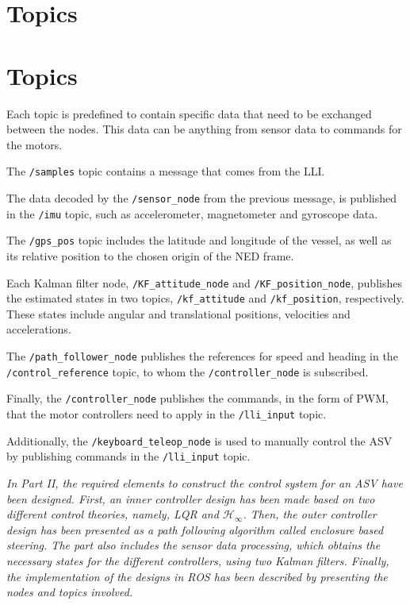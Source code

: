 \section{Topics}
\section{Topics}
Each topic is predefined to contain specific data that need to be exchanged between the nodes. This data can be anything from sensor data to commands for the motors.

The \lstinline[style=cinline]{/samples} topic contains a message that comes from the LLI.

The data decoded by the \lstinline[style=cinline]{/sensor_node} from the previous message, is published in the \lstinline[style=cinline]{/imu} topic, such as accelerometer, magnetometer and gyroscope data.

The \lstinline[style=cinline]{/gps_pos} topic includes the latitude and longitude of the vessel, as well as its relative position to the chosen origin of the NED frame.

Each Kalman filter node, \lstinline[style=cinline]{/KF_attitude_node} and \lstinline[style=cinline]{/KF_position_node}, publishes the estimated states in two topics, \lstinline[style=cinline]{/kf_attitude} and \lstinline[style=cinline]{/kf_position}, respectively. These states include angular and translational positions, velocities and accelerations.

The \lstinline[style=cinline]{/path_follower_node} publishes the references for speed and heading in the \lstinline[style=cinline]{/control_reference} topic, to whom the \lstinline[style=cinline]{/controller_node} is subscribed.

Finally, the \lstinline[style=cinline]{/controller_node} publishes the commands, in the form of PWM, that the motor controllers need to apply in the \lstinline[style=cinline]{/lli_input} topic.

Additionally, the \lstinline[style=cinline]{/keyboard_teleop_node} is used to manually control the ASV by publishing commands in the \lstinline[style=cinline]{/lli_input} topic. 


{\vspace*{\fill}
\textit{In Part II, the required elements to construct the control system for an ASV have been designed. First, an inner controller design has been made based on two different control theories, namely, LQR and $\mathcal{H}_\infty$. Then, the outer controller design has been presented as a path following algorithm called enclosure based steering. The part also includes the sensor data processing, which obtains the necessary states for the different controllers, using two Kalman filters. Finally, the implementation of the designs in ROS has been described by presenting the nodes and topics involved.}}



